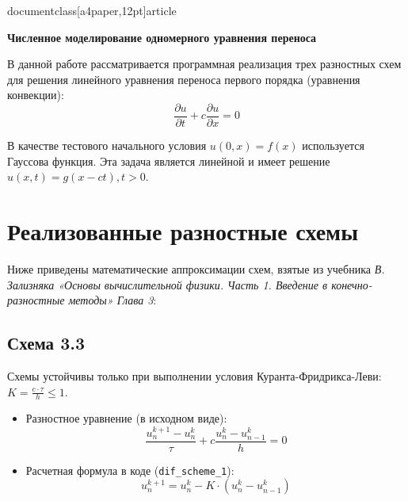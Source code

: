 documentclass[a4paper,12pt]{article}

\usepackage[T2A]{fontenc}
\usepackage[utf8]{inputenc}
\usepackage[russian]{babel}

\usepackage{amsmath}
\usepackage{amsfonts}
\usepackage{amssymb}

\usepackage[left=2cm,right=2cm,top=2cm,bottom=2cm]{geometry}



\pagestyle{empty}

\begin{center}
    \large\bfseries Численное моделирование одномерного уравнения переноса
\end{center}

\vspace{0.5cm}

В данной работе рассматривается программная реализация трех разностных схем для решения линейного уравнения переноса первого порядка (уравнения конвекции):
\begin{equation*}
    \frac{\partial u}{\partial t} + c \frac{\partial u}{\partial x} = 0
\end{equation*}

В качестве тестового начального условия $u(0, x) = f(x)$ используется Гауссова функция. Эта задача является линейной и имеет решение $u(x, t) = g(x - ct), t > 0$.

\section{Реализованные разностные схемы}

Ниже приведены математические аппроксимации схем, взятые из учебника \textit{В. Зализняка «Основы вычислительной физики. Часть 1. Введение в конечно-разностные методы» Глава 3}:

\subsection{Схема 3.3}
Схемы устойчивы только при выполнении условия Куранта-Фридрикса-Леви: $K = \frac{c \cdot \tau}{h} \le 1$.
\begin{itemize}
    \item[] {Разностное уравнение (в исходном виде):}
    \begin{equation*}
        \frac{u_{n}^{k+1} - u_{n}^{k}}{\tau} + c \frac{u_{n}^{k} - u_{n-1}^{k}}{h} = 0
    \end{equation*}
    
    \item[] {Расчетная формула в коде (\texttt{dif\_scheme\_1}):}
    \begin{equation*}
        u_{n}^{k+1} = u_{n}^{k} - K \cdot (u_{n}^{k} - u_{n-1}^{k})
    \end{equation*}
\end{itemize}


